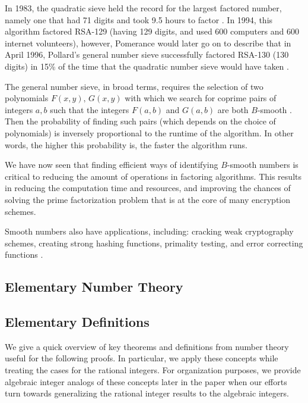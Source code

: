 \documentclass[12pt]{amsart}
\theoremstyle{definition}
\begin{document}
In 1983, the quadratic sieve held the record for the largest factored number, namely one that had 71 digits and took 9.5 hours to factor \cite{Pomerance2}. In 1994, this algorithm factored RSA-129 (having 129 digits, and used 600 computers and 600 internet volunteers), however, Pomerance would later go on to describe that in April 1996, Pollard's general number sieve successfully factored RSA-130 (130 digits) in 15\% of the time that the quadratic number sieve would have taken \cite{Pomerance0}. 

The general number sieve, in broad terms, requires the selection of two polynomials $F(x,y), \, G(x,y)$ with which we search for coprime pairs of integers $a,b$ such that the integers $F(a,b)$ and $G(a,b)$ are both $B$-smooth \cite{Bai}. Then the probability of finding such pairs (which depends on the choice of polynomials) is inversely proportional to the runtime of the algorithm. In other words, the higher this probability is, the faster the algorithm runs.

We have now seen that finding efficient ways of identifying $B$-smooth numbers is critical to reducing the amount of operations in factoring algorithms. This results in reducing the computation time and resources, and improving the chances of solving the prime factorization problem that is at the core of many encryption schemes. 

Smooth numbers also have applications, including: cracking weak cryptography schemes, creating strong hashing functions, primality testing, and error correcting functions \cite{Naccache}.

\subsection{Elementary Number Theory}


\subsection{Elementary Definitions}

We give a quick overview of key theorems and definitions from number theory useful for the following proofs. In particular, we apply these concepts while treating the cases for the rational integers. For organization purposes, we provide algebraic integer analogs of these concepts later in the paper when our efforts turn towards generalizing the rational integer results to the algebraic integers.
\end{document}
